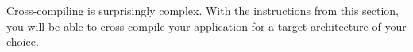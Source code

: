 Cross-compiling is surprisingly complex. With the instructions from this section, you will be able to cross-compile your application for a target architecture of your choice.

























